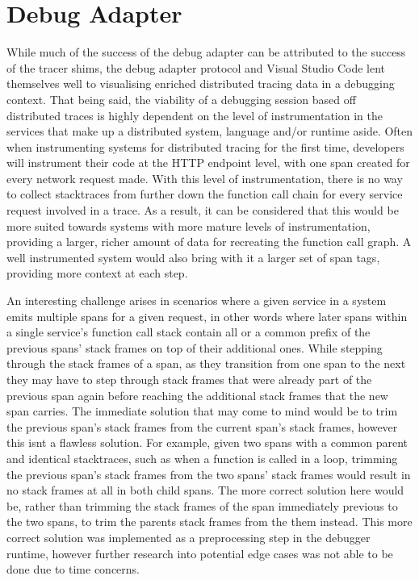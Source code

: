\documentclass[12pt,pdftex,titlepage]{report}
\begin{document}
        \section{Debug Adapter}
            While much of the success of the debug adapter can be attributed to the success of the tracer shims, the debug adapter protocol and Visual Studio Code lent themselves well to visualising
            enriched distributed tracing data in a debugging context. That being said, the viability of a debugging session based off distributed traces is highly dependent on the level of instrumentation
            in the services that make up a distributed system, language and/or runtime aside. Often when instrumenting systems for distributed tracing for the first time, developers will instrument their code 
            at the HTTP endpoint level, with one span created for every network request made. With this level of instrumentation, there is no way to collect stacktraces from further down the function call 
            chain for every service request involved in a trace. As a result, it can be considered that this would be more suited towards systems with more mature levels of instrumentation, providing a larger, 
            richer amount of data for recreating the function call graph. A well instrumented system would also bring with it a larger set of span tags, providing more context at each step.
                
            An interesting challenge arises in scenarios where a given service in a system emits multiple spans for a given request, in other words where later spans within a single service's function call stack 
            contain all or a common prefix of the previous spans' stack frames on top of their additional ones. While stepping through the stack frames of a span, as they transition from one span to the next they 
            may have to step through stack frames that were already part of the previous span again before reaching the additional stack frames that the new span carries. The immediate solution that may come to mind
            would be to trim the previous span's stack frames from the current span's stack frames, however this isnt a flawless solution. For example, given two spans with a common parent and identical stacktraces,
            such as when a function is called in a loop, trimming the previous span's stack frames from the two spans' stack frames would result in no stack frames at all in both child spans. The more correct solution 
            here would be, rather than trimming the stack frames of the span immediately previous to the two spans, to trim the parents stack frames from the them instead. This more correct solution was implemented as a 
            preprocessing step in the debugger runtime, however further research into potential edge cases was not able to be done due to time concerns.
\end{document}
